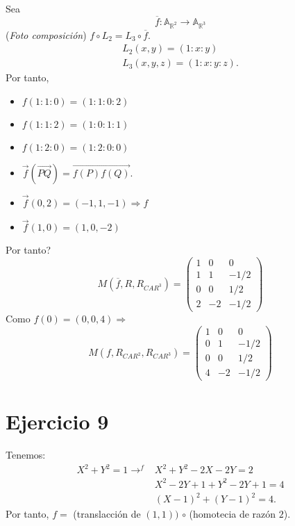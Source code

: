 \documentclass[10pt,a4paper,openright]{book}
\theoremstyle{break}
\begin{document}
Sea
\[
\overline{f}: \mathbb{A}_{\mathbb{R}^2} \rightarrow \mathbb{A}_{\mathbb{R}^3}   
\]
(\textit{Foto composición}) $f \circ L_2 = L_3 \circ \overline{f}$.
\begin{align*}
    L_2\left( x, y \right) = \left( 1 : x : y \right)\\
    L_3\left( x, y, z \right) = \left( 1 : x : y : z \right) 
.\end{align*}
Por tanto, 
\begin{itemize}
    \item $f \left( 1 : 1 : 0 \right) = \left( 1 : 1 : 0 : 2 \right)$
    \item $f \left( 1 : 1 : 2 \right) = \left( 1 : 0 : 1 : 1 \right)$
    \item $f \left( 1 : 2 : 0 \right) = \left( 1 : 2 : 0 : 0 \right)$
    \item $\overrightarrow{f} \left( \overrightarrow{PQ} \right) = \overrightarrow{f\left( P \right) f\left( Q \right)}$.
    \item $\overrightarrow{f} \left( 0, 2 \right) = \left( -1, 1, -1 \right) \Rightarrow f$
    \item $\overrightarrow{f} \left( 1, 0 \right) = \left( 1, 0, -2 \right)$
\end{itemize}
Por tanto?
\[
    M\left( \overline{f}, R, R_{CAR^3} \right) = \begin{pmatrix} 1 & 0 & 0\\ 1 & 1 & -1/2\\ 0 & 0 & 1/2\\ 2 & -2 & -1/2 \end{pmatrix} 
\]
Como $f\left( 0 \right) = \left( 0, 0 , 4 \right) \Rightarrow$
\[
    M\left( f, R_{CAR^2}, R_{CAR^3} \right) = \begin{pmatrix} 1 & 0 & 0\\ 0 & 1 & -1/2\\ 0 & 0 & 1/2\\ 4 & -2 & -1/2 \end{pmatrix} 
\]

\section{Ejercicio 9}%
\label{sec:ejercicio_9_2}
Tenemos: 
\begin{align*}
    X^2 + Y^2 = 1 \rightarrow^f &X^2 + Y^2 - 2X - 2Y = 2\\
    &X^2 - 2Y + 1 + Y^2 - 2Y + 1 = 4\\
    &\left( X - 1 \right)^2 + \left( Y - 1 \right)^2 = 4
.\end{align*}
Por tanto, $f = $ (translacción de $\left( 1, 1 \right))$ $\circ$ (homotecia de razón $2$).
\end{document}
